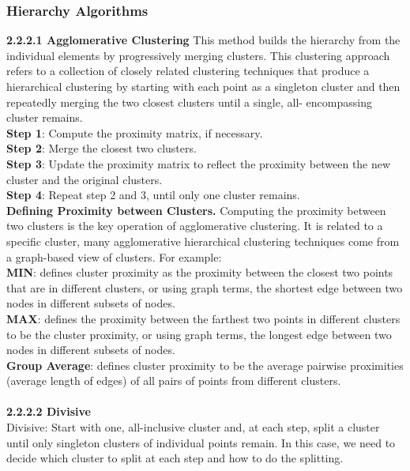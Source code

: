 \documentclass[a4paper,12pt,fleqn]{article}
\begin{document}
\subsubsection{Hierarchy Algorithms}%
\textbf{2.2.2.1 Agglomerative Clustering}
This method builds the hierarchy from the individual elements by progressively merging clusters. This clustering approach refers to a collection of closely related clustering techniques that produce a hierarchical clustering by starting with each point as a singleton cluster and then repeatedly merging the two closest clusters until a single, all- encompassing cluster remains. \\
\textbf{Step 1}: Compute the proximity matrix, if necessary.\\
\textbf{Step 2}: Merge the closest two clusters.\\
\textbf{Step 3}: Update the proximity matrix to reflect the proximity between the new cluster and the original clusters.\\
\textbf{Step 4}: Repeat step 2 and 3, until only one cluster remains.\\
\textbf{Defining Proximity between Clusters.}
Computing the proximity between two clusters is the key operation of agglomerative clustering. It is related to a specific cluster, many agglomerative hierarchical clustering techniques come from a graph-based view of clusters. For example:\\
\textbf{MIN}: defines cluster proximity as the proximity between the closest two points that are in different clusters, or using graph terms, the shortest edge between two nodes in different subsets of nodes. \\
\textbf{MAX}: defines the proximity between the farthest two points in different clusters to be the cluster proximity, or using graph terms, the longest edge between two nodes in different subsets of nodes. \\
\textbf{Group Average}: defines cluster proximity to be the average pairwise proximities (average length of edges) of all pairs of points from different clusters.\\
\\
\textbf{2.2.2.2 Divisive}\\
Divisive: Start with one, all-inclusive cluster and, at each step, split a cluster until only singleton clusters of individual points remain. In this case, we need to decide which cluster to split at each step and how to do the splitting. \\
\end{document}

